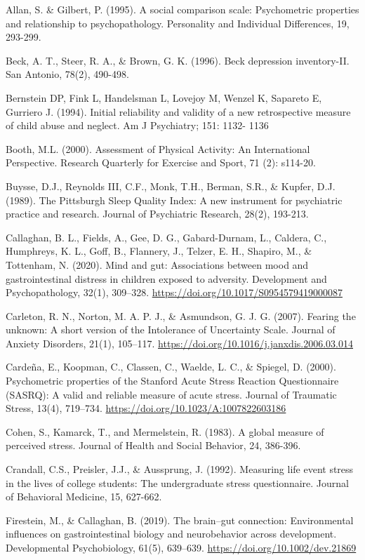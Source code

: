 \documentclass[]{book}
\begin{document}
Allan, S. \& Gilbert, P. (1995). A social comparison scale: Psychometric properties and
relationship to psychopathology. Personality and Individual Differences, 19, 293-299.

Beck, A. T., Steer, R. A., \& Brown, G. K. (1996). Beck depression inventory-II. San Antonio, 78(2), 490-498.

Bernstein DP, Fink L, Handelsman L, Lovejoy M, Wenzel K, Sapareto E, Gurriero J. (1994). Initial reliability and
validity of a new retrospective measure of child abuse and neglect. Am J Psychiatry; 151: 1132-
1136

Booth, M.L. (2000). Assessment of Physical Activity: An International Perspective. Research Quarterly for Exercise and Sport, 71 (2): s114-20.

Buysse, D.J., Reynolds III, C.F., Monk, T.H., Berman, S.R., \& Kupfer, D.J. (1989). The Pittsburgh Sleep Quality Index: A new instrument for psychiatric practice and research. Journal of Psychiatric Research, 28(2), 193-213.

Callaghan, B. L., Fields, A., Gee, D. G., Gabard-Durnam, L., Caldera, C., Humphreys, K. L., Goff, B., Flannery, J., Telzer, E. H., Shapiro, M., \& Tottenham, N. (2020). Mind and gut: Associations between mood and gastrointestinal distress in children exposed to adversity. Development and Psychopathology, 32(1), 309--328. \url{https://doi.org/10.1017/S0954579419000087}

Carleton, R. N., Norton, M. A. P. J., \& Asmundson, G. J. G. (2007). Fearing the unknown: A short version of the Intolerance of Uncertainty Scale. Journal of Anxiety Disorders, 21(1), 105--117. \url{https://doi.org/10.1016/j.janxdis.2006.03.014}

Cardeña, E., Koopman, C., Classen, C., Waelde, L. C., \& Spiegel, D. (2000). Psychometric properties of the Stanford Acute Stress Reaction Questionnaire (SASRQ): A valid and reliable measure of acute stress. Journal of Traumatic Stress, 13(4), 719--734. \url{https://doi.org/10.1023/A:1007822603186}

Cohen, S., Kamarck, T., and Mermelstein, R. (1983). A global measure of perceived stress. Journal of Health and Social Behavior, 24, 386-396.

Crandall, C.S., Preisler, J.J., \& Aussprung, J. (1992). Measuring life event stress in the lives of college students: The undergraduate stress questionnaire. Journal of Behavioral Medicine, 15, 627-662.

Firestein, M., \& Callaghan, B. (2019). The brain--gut connection: Environmental influences on gastrointestinal biology and neurobehavior across development. Developmental Psychobiology, 61(5), 639--639. \url{https://doi.org/10.1002/dev.21869}
\end{document}
